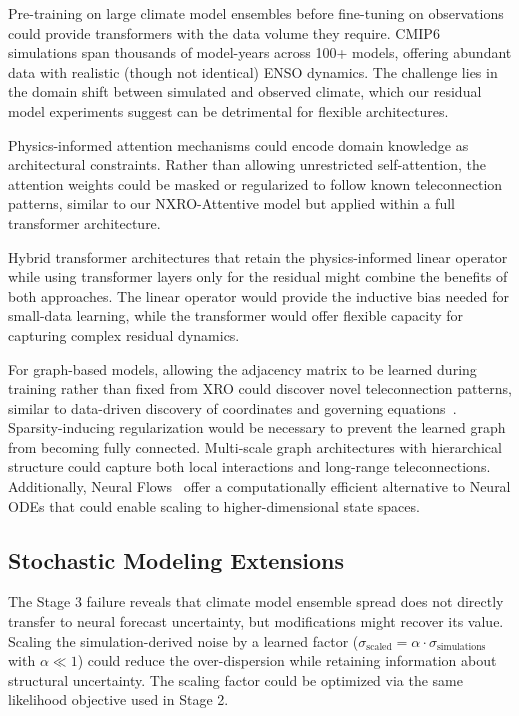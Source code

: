 Pre-training on large climate model ensembles before fine-tuning on observations could provide transformers with the data volume they require. CMIP6~\cite{eyring2016cmip6} simulations span thousands of model-years across 100+ models, offering abundant data with realistic (though not identical) ENSO dynamics. The challenge lies in the domain shift between simulated and observed climate, which our residual model experiments suggest can be detrimental for flexible architectures.

Physics-informed attention mechanisms could encode domain knowledge as architectural constraints. Rather than allowing unrestricted self-attention, the attention weights could be masked or regularized to follow known teleconnection patterns, similar to our NXRO-Attentive model but applied within a full transformer architecture.

Hybrid transformer architectures that retain the physics-informed linear operator while using transformer layers only for the residual might combine the benefits of both approaches. The linear operator would provide the inductive bias needed for small-data learning, while the transformer would offer flexible capacity for capturing complex residual dynamics.

For graph-based models, allowing the adjacency matrix to be learned during training rather than fixed from XRO could discover novel teleconnection patterns, similar to data-driven discovery of coordinates and governing equations~\cite{champion2019data}. Sparsity-inducing regularization would be necessary to prevent the learned graph from becoming fully connected. Multi-scale graph architectures with hierarchical structure could capture both local interactions and long-range teleconnections. Additionally, Neural Flows~\cite{bilos2021neural} offer a computationally efficient alternative to Neural ODEs that could enable scaling to higher-dimensional state spaces.

\subsection{Stochastic Modeling Extensions}

The Stage 3 failure reveals that climate model ensemble spread does not directly transfer to neural forecast uncertainty, but modifications might recover its value. Scaling the simulation-derived noise by a learned factor ($\sigma_{\text{scaled}} = \alpha \cdot \sigma_{\text{simulations}}$ with $\alpha \ll 1$) could reduce the over-dispersion while retaining information about structural uncertainty. The scaling factor could be optimized via the same likelihood objective used in Stage 2.

